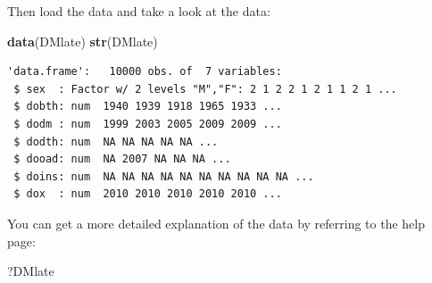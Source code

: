 \documentclass[
]{book}
\newenvironment{Shaded}{\begin{snugshade}}{\end{snugshade}}
\newcommand{\FunctionTok}[1]{\textcolor[rgb]{0.13,0.29,0.53}{\textbf{#1}}}
\newcommand{\NormalTok}[1]{#1}
\begin{document}
Then load the data and take a look at the data:

\begin{Shaded}
\begin{Highlighting}[]
\FunctionTok{data}\NormalTok{(DMlate)}
\FunctionTok{str}\NormalTok{(DMlate)}
\end{Highlighting}
\end{Shaded}

\begin{verbatim}
'data.frame':   10000 obs. of  7 variables:
 $ sex  : Factor w/ 2 levels "M","F": 2 1 2 2 1 2 1 1 2 1 ...
 $ dobth: num  1940 1939 1918 1965 1933 ...
 $ dodm : num  1999 2003 2005 2009 2009 ...
 $ dodth: num  NA NA NA NA NA ...
 $ dooad: num  NA 2007 NA NA NA ...
 $ doins: num  NA NA NA NA NA NA NA NA NA NA ...
 $ dox  : num  2010 2010 2010 2010 2010 ...
\end{verbatim}

You can get a more detailed explanation of the data by referring to
the help page:

\begin{Shaded}
\begin{Highlighting}[]
\NormalTok{?DMlate}
\end{Highlighting}
\end{Shaded}
\end{document}
